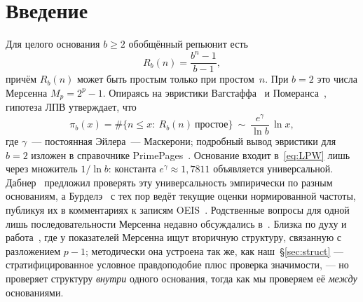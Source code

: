 \documentclass[11pt,a4paper]{article}
\theoremstyle{plain}
\theoremstyle{remark}
\newcommand{\Rb}{R_b}
\newcommand{\eg}{e^{\gamma}}
\begin{document}
\begin{otherlanguage}{english}
\begin{abstract}
\medskip
\noindent\textbf{Keywords:} repunit primes, generalized repunits, Mersenne
primes, Lenstra--Pomerance--Wagstaff conjecture, Euler--Mascheroni constant,
observation scheme, Type-I censoring, inverse sampling, Poisson point process,
conditional likelihood, sufficient statistic, estimator bias, statistical
power, computational number theory

\medskip
\noindent\textbf{Acknowledgments:} the author thanks the Great Internet Mersenne
Prime Search (GIMPS) project for providing the Mersenne prime data through the
open PrimeNet report (\url{https://www.mersenne.org/}); the Mersenne exponents
were retrieved on 27 August 2026. The author is grateful to the OEIS contributors
who have maintained the generalized repunit prime sequences for many years.

\medskip
\noindent\textbf{Funding:} this research received no external funding.
\end{abstract}
\end{otherlanguage}

\section{Введение}

Для целого основания $b\ge2$ обобщённый репьюнит есть
\begin{equation}\label{eq:Rb}
\Rb(n)=\frac{b^{n}-1}{b-1},
\end{equation}
причём $\Rb(n)$ может быть простым только при простом~$n$. При $b=2$ это числа Мерсенна
$M_p=2^{p}-1$. Опираясь на эвристики Вагстаффа~\cite{wagstaff1983} и
Померанса~\cite{pomerance1981}, гипотеза ЛПВ утверждает, что
\begin{equation}\label{eq:LPW}
\pi_b(x)=\#\{n\le x:\ \Rb(n)\ \text{простое}\}\ \sim\ \frac{\eg}{\ln b}\,\ln x,
\end{equation}
где $\gamma$~--- постоянная Эйлера~--- Маскерони; подробный вывод эвристики для
$b=2$ изложен в справочнике PrimePages~\cite{t5k}. Основание входит
в~\eqref{eq:LPW} лишь через множитель $1/\ln b$: константа $\eg\approx1{,}7811$
объявляется универсальной.
Дабнер~\cite{dubner1993} предложил проверять эту универсальность эмпирически по разным
основаниям, а Бурделэ~\cite{bourdelais2009} с тех пор ведёт текущие оценки нормированной
частоты, публикуя их в комментариях к записям OEIS~\cite{oeis}. Родственные вопросы для
одной лишь последовательности Мерсенна недавно обсуждались в~\cite{wagstaff2025}.
Близка по духу и работа~\cite{dominguez2026}, где у показателей Мерсенна ищут
вторичную структуру, связанную с разложением $p-1$; методически она устроена так же,
как наш~\S\ref{sec:struct} --- стратифицированное условное правдоподобие плюс
проверка значимости, --- но проверяет структуру \emph{внутри} одного основания,
тогда как мы проверяем её \emph{между} основаниями.
\end{document}
